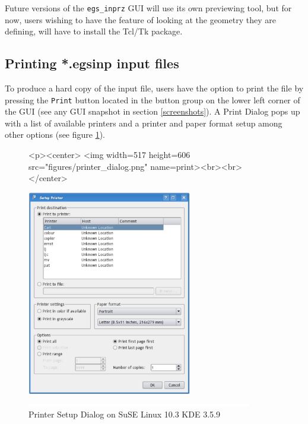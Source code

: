 \documentclass[12pt,twoside]{article}   %
\begin{document}
Future versions of the {\tt egs\_inprz} GUI will use its own
previewing tool, but for now, users wishing to have the feature of looking
at the geometry they are defining, will have to install the Tcl/Tk package.

\subsection{Printing *.egsinp input files}

 To produce a hard copy of the input file, users have the option to print the file
 by pressing the {\tt Print} button located in the button group on the lower left
 corner of the GUI (see any GUI snapshot in section \ref{screenshots}). A Print
 Dialog pops up with a list of available printers and a printer and  paper format
 setup among other options (see figure \ref{print}).\\

\begin{figure}[htb]
\begin{htmlonly}
\begin{rawhtml}
<p><center>
<img width=517 height=606 src="figures/printer_dialog.png" name=print><br><br>
</center>
\end{rawhtml}
\end{htmlonly}
\begin{latexonly}
\begin{center}
\includegraphics[height=9cm]{figures/printer_dialog}
\end{center}
\end{latexonly}
\begin{center}
\includegraphics[height=1mm]{figures/fake2}
\end{center}
\caption{\label{print}Printer Setup Dialog on SuSE Linux 10.3 KDE 3.5.9}
\end{figure}
\end{document}
